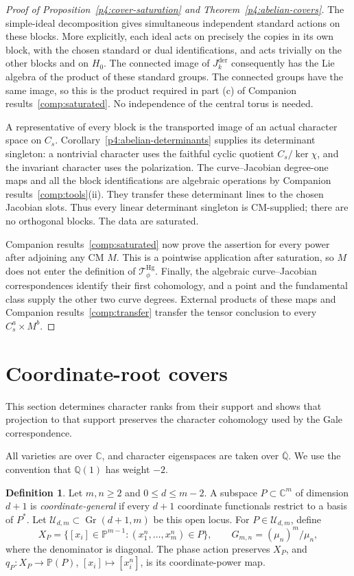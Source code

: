 \documentclass[11pt]{article}
\newcommand{\Q}{\mathbb Q}
\newcommand{\C}{\mathbb C}
\newcommand{\PP}{\mathbb P}
\newcommand{\Gr}{\operatorname{Gr}}
\newcommand{\kk}{\overline{\Q}}
\newcommand{\U}{\mathcal U}
\theoremstyle{plain}
\theoremstyle{definition}
\newtheorem{definition}[theorem]{Definition}
\theoremstyle{remark}
\numberwithin{equation}{section}
\begin{document}
\begin{proof}[Proof of Proposition~\ref{p4:cover-saturation} and Theorem~\ref{p4:abelian-covers}]
The simple-ideal decomposition gives simultaneous independent
standard actions on these blocks.  More explicitly, each ideal acts
on precisely the copies in its own block, with the chosen standard
or dual identifications, and acts trivially on the other blocks and
on $H_0$.  The connected image of $J^{\mathrm{der}}_k$ consequently
has the Lie algebra of the product of these standard groups.  The
connected groups have the same image, so this is the product required
in part \textnormal{(c)} of Companion results~\ref{comp:saturated}.
No independence of the central torus is needed.

A representative of every block is the transported image of an actual
character space on $C_s$.  Corollary~\ref{p4:abelian-determinants} supplies its determinant
singleton: a nontrivial character uses the faithful cyclic quotient
$C_s/\ker\chi$, and the invariant character uses the polarization.
The curve--Jacobian degree-one maps and all the block identifications
are algebraic operations by Companion results~\ref{comp:tools}\textup{(ii)}.
They transfer these determinant lines to the chosen Jacobian slots.
Thus every linear determinant singleton is CM-supplied; there are
no orthogonal blocks.  The data are saturated.

Companion results~\ref{comp:saturated} now prove the assertion for every
power after adjoining any CM $M$.  This is a pointwise application
after saturation, so $M$ does not enter the definition of
$\mathcal T_\phi^{\mathrm{Hg}}$.  Finally, the algebraic
curve--Jacobian correspondences identify their first cohomology, and
a point and the fundamental class supply the other two curve degrees.
External products of these maps and
Companion results~\ref{comp:transfer} transfer the tensor
conclusion to every $C_s^a\times M^b$.
\end{proof}

\section{Coordinate-root covers}\label{sec:roots}
This section determines character ranks from their support and
shows that projection to that support preserves the character
cohomology used by the Gale correspondence.

All varieties are over \(\C\), and character eigenspaces are taken
over \(\kk\).  We use the convention that \(\Q(1)\)
has weight \(-2\).

\begin{definition}\label{def:root}
Let \(m,n\geq2\) and \(0\leq d\leq m-2\).  A subspace
\(P\subset\C^m\) of dimension \(d+1\) is \emph{coordinate-general}
if every \(d+1\) coordinate functionals restrict to a basis of
\(P^*\).  Let \(\U_{d,m}\subset\Gr(d+1,m)\) be this open locus.
For \(P\in\U_{d,m}\), define
\[
 X_P=\{[x_i]\in\PP^{m-1}:(x_1^n,\ldots,x_m^n)\in P\},\qquad
 G_{m,n}=(\mu_n)^m/\mu_n,
\]
where the denominator is diagonal.  The phase action preserves \(X_P\),
and \(q_P:X_P\to\PP(P)\), \([x_i]\mapsto[x_i^n]\), is its
coordinate-power map.
\end{definition}
\end{document}
